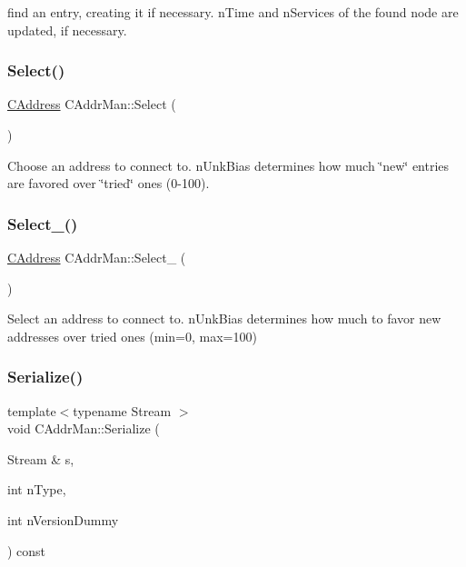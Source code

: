 find an entry, creating it if necessary. n\+Time and n\+Services of the found node are updated, if necessary. \mbox{\label{class_c_addr_man_ae4b1b65cc15f9a12f90db362fb9c8488}} 
\subsubsection{\texorpdfstring{Select()}{Select()}}
{\footnotesize\ttfamily \mbox{\hyperlink{class_c_address}{C\+Address}} C\+Addr\+Man\+::\+Select (\begin{DoxyParamCaption}{ }\end{DoxyParamCaption})\hspace{0.3cm}{\ttfamily [inline]}}

Choose an address to connect to. n\+Unk\+Bias determines how much \char`\"{}new\char`\"{} entries are favored over \char`\"{}tried\char`\"{} ones (0-\/100). \mbox{\label{class_c_addr_man_af34f24d32505ff3590cbacbc4cc4c09e}} 
\subsubsection{\texorpdfstring{Select\_()}{Select\_()}}
{\footnotesize\ttfamily \mbox{\hyperlink{class_c_address}{C\+Address}} C\+Addr\+Man\+::\+Select\+\_\+ (\begin{DoxyParamCaption}{ }\end{DoxyParamCaption})\hspace{0.3cm}{\ttfamily [protected]}}

Select an address to connect to. n\+Unk\+Bias determines how much to favor new addresses over tried ones (min=0, max=100) \mbox{\label{class_c_addr_man_a08668d8cf435750a80316b4708bbc9eb}} 
\subsubsection{\texorpdfstring{Serialize()}{Serialize()}}
{\footnotesize\ttfamily template$<$typename Stream $>$ \\
void C\+Addr\+Man\+::\+Serialize (\begin{DoxyParamCaption}\item[{Stream \&}]{s,  }\item[{int}]{n\+Type,  }\item[{int}]{n\+Version\+Dummy }\end{DoxyParamCaption}) const\hspace{0.3cm}{\ttfamily [inline]}}


